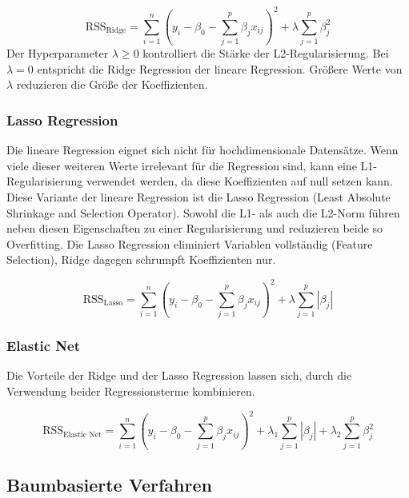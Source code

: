 \begin{equation}
\text{RSS}_{\text{Ridge}} = \sum_{i=1}^{n}\left(y_i - \beta_0 - \sum_{j=1}^{p}\beta_j x_{ij}\right)^2 + \lambda \sum_{j=1}^{p}\beta_j^2
\label{eq:rss-ridge}
\end{equation}
Der Hyperparameter \(\lambda \geq 0\) kontrolliert die Stärke der L2-Regularisierung. Bei \(\lambda = 0\) entspricht die Ridge Regression der lineare Regression. Größere Werte von \(\lambda\) reduzieren die Größe der Koeffizienten. \cite{Hastie2009}

\subsubsection{Lasso Regression}
Die lineare Regression eignet sich nicht für hochdimensionale Datensätze. Wenn viele dieser weiteren Werte irrelevant für die Regression sind, kann eine L1-Regularisierung verwendet werden, da diese Koeffizienten auf null setzen kann. Diese Variante der lineare Regression ist die Lasso Regression (Least Absolute Shrinkage and Selection Operator). Sowohl die L1- als auch die L2-Norm führen neben diesen Eigenschaften zu einer Regularisierung und reduzieren beide so Overfitting. Die Lasso Regression eliminiert Variablen vollständig (Feature Selection), Ridge dagegen schrumpft Koeffizienten nur. \cite{Hastie2009}

\begin{equation}
\text{RSS}_{\text{Lasso}} = \sum_{i=1}^{n}\left(y_i - \beta_0 - \sum_{j=1}^{p}\beta_j x_{ij}\right)^2 + \lambda \sum_{j=1}^{p}|\beta_j|
\label{eq:reg-lasso}
\end{equation}

\subsubsection{Elastic Net}
Die Vorteile der Ridge und der Lasso Regression lassen sich, durch die Verwendung beider Regressionsterme kombinieren. \cite{Hastie2009}

\begin{equation}
\text{RSS}_{\text{Elastic Net}} = \sum_{i=1}^{n}\left(y_i - \beta_0 - \sum_{j=1}^{p}\beta_j x_{ij}\right)^2 + \lambda_1 \sum_{j=1}^{p}|\beta_j| + \lambda_2 \sum_{j=1}^{p}\beta_j^2
\label{eq:reg-elastic}
\end{equation}

\subsection{Baumbasierte Verfahren}

